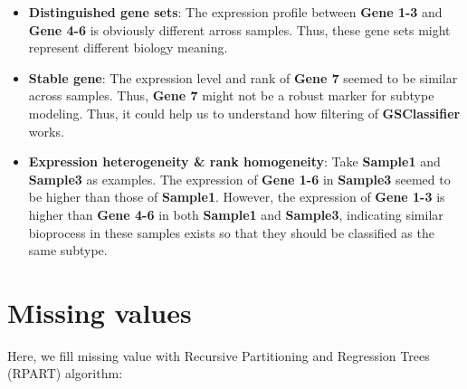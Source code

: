 \documentclass[
  12pt,
]{book}
\begin{document}
\begin{itemize}
\item
  \textbf{Distinguished gene sets}: The expression profile between \textbf{Gene 1-3} and \textbf{Gene 4-6} is obviously different arross samples. Thus, these gene sets might represent different biology meaning.
\item
  \textbf{Stable gene}: The expression level and rank of \textbf{Gene 7} seemed to be similar across samples. Thus, \textbf{Gene 7} might not be a robust marker for subtype modeling. Thus, it could help us to understand how filtering of \textbf{GSClassifier} works.
\item
  \textbf{Expression heterogeneity \& rank homogeneity}: Take \textbf{Sample1} and \textbf{Sample3} as examples. The expression of \textbf{Gene 1-6} in \textbf{Sample3} seemed to be higher than those of \textbf{Sample1}. However, the expression of \textbf{Gene 1-3} is higher than \textbf{Gene 4-6} in both \textbf{Sample1} and \textbf{Sample3}, indicating similar bioprocess in these samples exists so that they should be classified as the same subtype.
\end{itemize}

\hypertarget{missing-values}{%
\section{Missing values}\label{missing-values}}

Here, we fill missing value with Recursive Partitioning and Regression Trees (RPART) algorithm:
\end{document}
